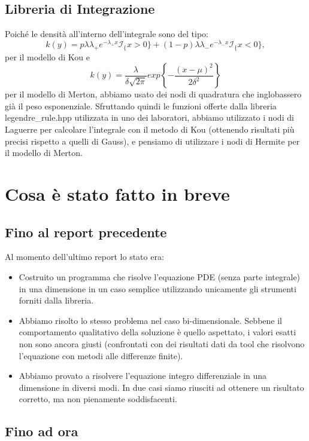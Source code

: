 \documentclass[a4paper,10pt]{article}
\begin{document}
\subsection{Libreria di Integrazione}
Poich\'e le densit\`a all'interno dell'integrale sono del tipo: $$k(y)=p\lambda\lambda_+e^{-\lambda_+x}\mathcal{I}_\{x>0\}+(1-p)\lambda\lambda_-e^{-\lambda_-x}\mathcal{I}_\{x<0\},$$ per il modello di Kou e $$k(y)=\frac{\lambda}{\delta\sqrt{2\pi}}exp\left\{-\frac{(x-\mu)^2}{2\delta^2}\right\}$$ per il modello di Merton, abbiamo usato dei nodi di quadratura che inglobassero gi\`a il peso esponenziale. Sfruttando quindi le funzioni offerte dalla libreria \textsf{legendre\_rule.hpp} utilizzata in uno dei laboratori, abbiamo utilizzato i nodi di Laguerre per calcolare l'integrale con il metodo di Kou (ottenendo risultati pi\`u precisi rispetto a quelli di Gauss), e pensiamo di utilizzare i nodi di Hermite per il modello di Merton.

\section{Cosa è stato fatto in breve}

\subsection{Fino al report precedente}
Al momento dell'ultimo report lo stato era:

\begin{itemize}
 \item Costruito un programma che risolve l'equazione PDE  (senza parte integrale) in una dimensione in un caso semplice utilizzando unicamente gli strumenti forniti dalla libreria.
 \item Abbiamo risolto lo stesso problema nel caso bi-dimensionale. Sebbene il comportamento qualitativo della soluzione è quello aspettato, i valori esatti non sono ancora giusti (confrontati con dei risultati dati da tool che risolvono l'equazione con metodi alle differenze finite).
 \item Abbiamo provato a risolvere l'equazione integro differenziale in una dimensione in diversi modi. In due casi siamo riusciti ad ottenere un risultato corretto, ma non pienamente soddisfacenti.
\end{itemize}

\subsection{Fino ad ora}
\end{document}
